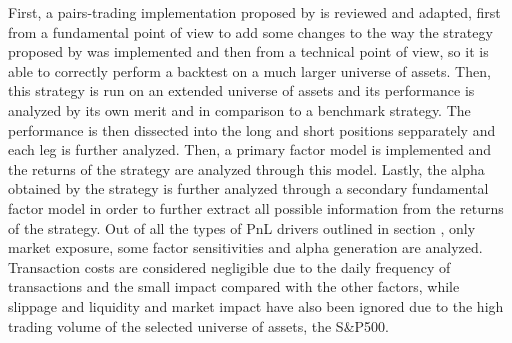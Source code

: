 First, a pairs-trading implementation proposed by \cite{gallego_2023} is reviewed and adapted, first from a fundamental point of view to add some changes to the way the strategy proposed by \cite{ioannis_2023} was implemented and then from a technical point of view, so it is able to correctly perform a backtest on a much larger universe of assets. Then, this strategy is run on an extended universe of assets and its performance is analyzed by its own merit and in comparison to a benchmark strategy. The performance is then dissected into the long and short positions sepparately and each leg is further analyzed. 
Then, a primary factor model is implemented and the returns of the strategy are analyzed through this model.  
Lastly, the alpha obtained by the strategy is further analyzed through a secondary fundamental factor model in order to further extract all possible information from the returns of the strategy. 
Out of all the types of PnL drivers outlined in section , only market exposure, some factor sensitivities and alpha generation are analyzed. Transaction costs are considered negligible due to the daily frequency of transactions and the small impact compared with the other factors, while slippage and liquidity and market impact have also been ignored due to the high trading volume of the selected universe of assets, the S\&P500. 
